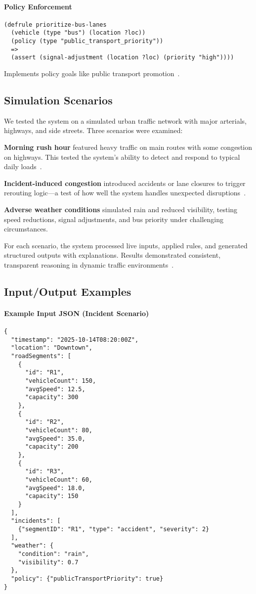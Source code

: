 \documentclass{article}
\begin{document}
\paragraph{Policy Enforcement}
\begin{verbatim}
(defrule prioritize-bus-lanes
  (vehicle (type "bus") (location ?loc))
  (policy (type "public_transport_priority"))
  =>
  (assert (signal-adjustment (location ?loc) (priority "high"))))
\end{verbatim}
Implements policy goals like public transport promotion~\cite{xu_consistency_2006}.

\subsection{Simulation Scenarios}
We tested the system on a simulated urban traffic network with major arterials, highways, and side streets. Three scenarios were examined:

\textbf{Morning rush hour} featured heavy traffic on main routes with some congestion on highways. This tested the system's ability to detect and respond to typical daily loads~\cite{jiang_spatiotemporal_2017}.

\textbf{Incident-induced congestion} introduced accidents or lane closures to trigger rerouting logic—a test of how well the system handles unexpected disruptions~\cite{epj_scaling_2024}.

\textbf{Adverse weather conditions} simulated rain and reduced visibility, testing speed reductions, signal adjustments, and bus priority under challenging circumstances.

For each scenario, the system processed live inputs, applied rules, and generated structured outputs with explanations. Results demonstrated consistent, transparent reasoning in dynamic traffic environments~\cite{russell_ai_2009}.

\subsection{Input/Output Examples}

\paragraph{Example Input JSON (Incident Scenario)}
\begin{verbatim}
{
  "timestamp": "2025-10-14T08:20:00Z",
  "location": "Downtown",
  "roadSegments": [
    {
      "id": "R1",
      "vehicleCount": 150,
      "avgSpeed": 12.5,
      "capacity": 300
    },
    {
      "id": "R2",
      "vehicleCount": 80,
      "avgSpeed": 35.0,
      "capacity": 200
    },
    {
      "id": "R3",
      "vehicleCount": 60,
      "avgSpeed": 18.0,
      "capacity": 150
    }
  ],
  "incidents": [
    {"segmentID": "R1", "type": "accident", "severity": 2}
  ],
  "weather": {
    "condition": "rain",
    "visibility": 0.7
  },
  "policy": {"publicTransportPriority": true}
}
\end{verbatim}
\end{document}
